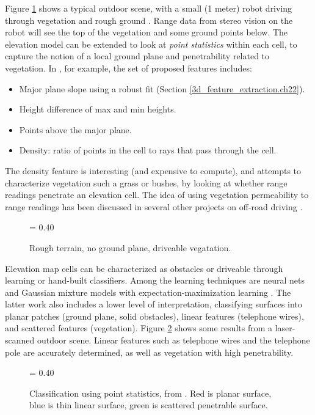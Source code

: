 \documentclass[twocolumn,oneside]{book}
\begin{document}
Figure \ref{rough_terrain.ch22} shows a typical outdoor scene, with a
small (1 meter) robot driving through vegetation and rough ground
\cite{konolige06}.  Range data from stereo vision on the robot will
see the top of the vegetation and some ground points below.  The
elevation model can be extended to look at {\em point statistics}
within each cell, to capture the notion of a local ground plane and
penetrability related to vegetation.  In \cite{ollis06}, for
example, the set of proposed features includes:
\begin{itemize}
\item Major plane slope using a robust fit (Section
\ref{3d_feature_extraction.ch22}). 
\item Height difference of max and min heights.
\item Points above the major plane.
\item Density: ratio of points in the cell to rays that pass through
the cell.
\end{itemize}
The density feature is interesting (and expensive to compute), and
attempts to characterize vegetation such a grass or bushes, by looking
at whether range readings penetrate an elevation cell.  The idea of
using vegetation permeability to range readings has been discussed in
several other projects on off-road driving
\cite{manduchi03,lalonde05,kelly05}.  

\begin{figure}[hbt]
{\epsfxsize = 0.40\textwidth {}}
\caption{Rough terrain, no ground plane, driveable vegatation.
\label{rough_terrain.ch22}}
\end{figure}

Elevation map cells can be characterized as obstacles or driveable
through learning or hand-built classifiers.  Among the learning
techniques are neural nets \cite{ollis06} and Gaussian mixture
models with expectation-maximization learning \cite{vandapel06}.
The latter work also includes a lower level of interpretation,
classifying surfaces into planar patches (ground plane, solid
obstacles), linear features (telephone wires), and scattered features
(vegetation).  Figure \ref{point_classified.ch22} shows some results
from a laser-scanned outdoor scene.  Linear features such as telephone
wires and the telephone pole are accurately determined, as well as
vegetation with high penetrability.

\begin{figure}[hbt]
{\epsfxsize = 0.40\textwidth {}}
\caption{Classification using point statistics, from
\cite{vandapel06}.  Red is planar surface, blue is thin linear
surface, green is scattered penetrable surface.
\label{point_classified.ch22}}
\end{figure}
\end{document}
